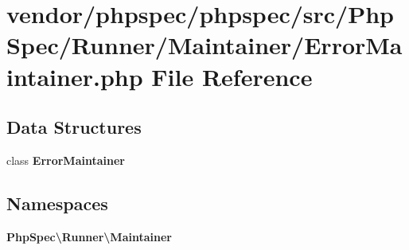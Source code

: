 \section{vendor/phpspec/phpspec/src/\+Php\+Spec/\+Runner/\+Maintainer/\+Error\+Maintainer.php File Reference}
\label{_error_maintainer_8php}
\subsection*{Data Structures}
\begin{DoxyCompactItemize}
\item 
class {\bf Error\+Maintainer}
\end{DoxyCompactItemize}
\subsection*{Namespaces}
\begin{DoxyCompactItemize}
\item 
 {\bf Php\+Spec\textbackslash{}\+Runner\textbackslash{}\+Maintainer}
\end{DoxyCompactItemize}
